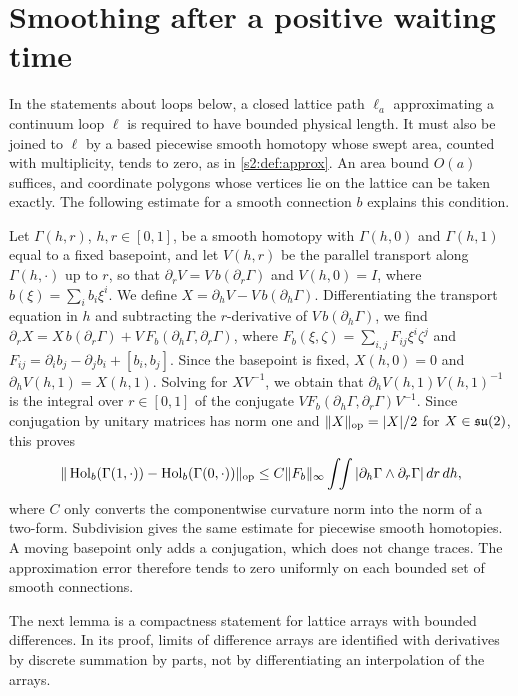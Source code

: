 \section{Smoothing after a positive waiting time}\label{ch22:sec:smoothing}

In the statements about loops below, a closed lattice path $\ell_a$ approximating a continuum loop $\ell$ is required to have bounded physical length. It must also be joined to $\ell$ by a based piecewise smooth homotopy whose swept area, counted with multiplicity, tends to zero, as in \cref{s2:def:approx}. An area bound $O(a)$ suffices, and coordinate polygons whose vertices lie on the lattice can be taken exactly. The following estimate for a smooth connection $b$ explains this condition.

Let $\Gamma(h,r)$, $h,r\in[0,1]$, be a smooth homotopy with $\Gamma(h,0)$ and $\Gamma(h,1)$ equal to a fixed basepoint, and let $V(h,r)$ be the parallel transport along $\Gamma(h,\cdot)$ up to $r$, so that $\partial_rV=V\,b(\partial_r\Gamma)$ and $V(h,0)=I$, where $b(\xi)=\sum_ib_i\xi^i$. We define $X=\partial_hV-V\,b(\partial_h\Gamma)$. Differentiating the transport equation in $h$ and subtracting the $r$-derivative of $V\,b(\partial_h\Gamma)$, we find $\partial_rX=X\,b(\partial_r\Gamma)+V\,F_b(\partial_h\Gamma,\partial_r\Gamma)$, where $F_b(\xi,\zeta)=\sum_{i,j}F_{ij}\xi^i\zeta^j$ and $F_{ij}=\partial_ib_j-\partial_jb_i+[b_i,b_j]$. Since the basepoint is fixed, $X(h,0)=0$ and $\partial_hV(h,1)=X(h,1)$. Solving for $XV^{-1}$, we obtain that $\partial_hV(h,1)V(h,1)^{-1}$ is the integral over $r\in[0,1]$ of the conjugate $VF_b(\partial_h\Gamma,\partial_r\Gamma)V^{-1}$. Since conjugation by unitary matrices has norm one and $\|X\|_{\rm op}=|X|/2$ for $X\in\mathfrak{su}(2)$, this proves
\begin{equation}\label{ch22:eq:smooth-path-area}
 \|\operatorname{Hol}_b(\Gamma(1,\cdot))-\operatorname{Hol}_b(\Gamma(0,\cdot))\|_{\rm op}\le C\|F_b\|_\infty\int\!\!\int|\partial_h\Gamma\wedge\partial_r\Gamma|\,dr\,dh,
\end{equation}
where $C$ only converts the componentwise curvature norm into the norm of a two-form. Subdivision gives the same estimate for piecewise smooth homotopies. A moving basepoint only adds a conjugation, which does not change traces. The approximation error therefore tends to zero uniformly on each bounded set of smooth connections.

The next lemma is a compactness statement for lattice arrays with bounded differences. In its proof, limits of difference arrays are identified with derivatives by discrete summation by parts, not by differentiating an interpolation of the arrays.

